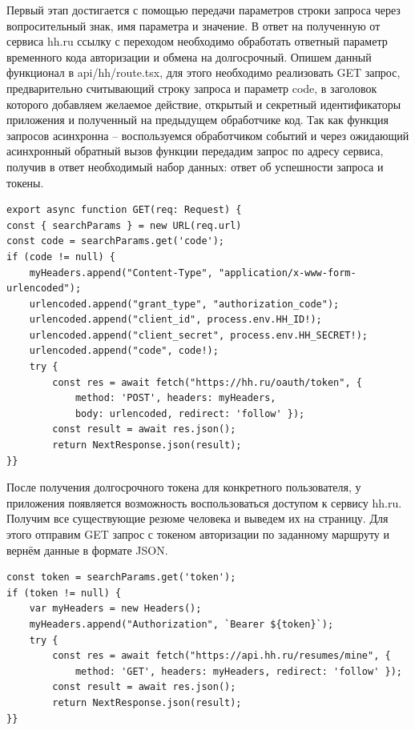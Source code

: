 \documentclass[master, och, diploma]{SCWorks}
\begin{document}
Первый этап достигается с помощью передачи параметров строки запроса через вопросительный знак, имя параметра и значение. В ответ на полученную от сервиса hh.ru ссылку с переходом необходимо обработать ответный параметр временного кода авторизации и обмена на долгосрочный. Опишем данный функционал в api/hh/route.tsx, для этого необходимо реализовать GET запрос, предварительно считывающий строку запроса и параметр code, в заголовок которого добавляем желаемое действие, открытый и секретный идентификаторы приложения и полученный на предыдущем обработчике код. Так как функция запросов асинхронна – воспользуемся обработчиком событий и через ожидающий асинхронный обратный вызов функции передадим запрос по адресу сервиса, получив в ответ необходимый набор данных: ответ об успешности запроса и токены\cite{Razin_2020}.
\begin{verbatim}
export async function GET(req: Request) {
const { searchParams } = new URL(req.url)
const code = searchParams.get('code');
if (code != null) {
    myHeaders.append("Content-Type", "application/x-www-form-urlencoded");
    urlencoded.append("grant_type", "authorization_code");
    urlencoded.append("client_id", process.env.HH_ID!);
    urlencoded.append("client_secret", process.env.HH_SECRET!);
    urlencoded.append("code", code!);
    try {
        const res = await fetch("https://hh.ru/oauth/token", {
            method: 'POST', headers: myHeaders,
            body: urlencoded, redirect: 'follow' });   
        const result = await res.json();
        return NextResponse.json(result);
}} 
\end{verbatim}

После получения долгосрочного токена для конкретного пользователя, у приложения появляется возможность воспользоваться доступом к сервису hh.ru. Получим все существующие резюме человека и выведем их на страницу. Для этого отправим GET запрос с токеном авторизации по заданному маршруту и вернём данные в формате JSON.
\begin{verbatim}
const token = searchParams.get('token');
if (token != null) {
    var myHeaders = new Headers();
    myHeaders.append("Authorization", `Bearer ${token}`);
    try {
        const res = await fetch("https://api.hh.ru/resumes/mine", {
            method: 'GET', headers: myHeaders, redirect: 'follow' });      
        const result = await res.json();
        return NextResponse.json(result);
}}
\end{verbatim}
\end{document}

